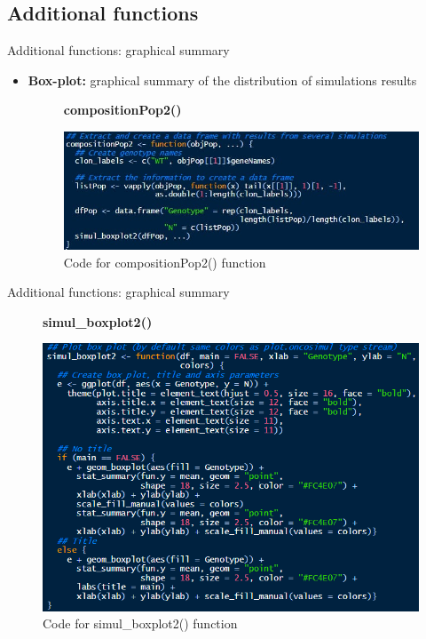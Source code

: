 \subsection{Additional functions}

\begin{frame}{Additional functions: graphical summary}
    \begin{itemize}
        \item \textbf{Box-plot:} graphical summary of the distribution of simulations results
        \textbf{}
        \begin{figure}[t]
            \centering
            \textbf{compositionPop2()}\par\medskip
            \includegraphics[scale=0.6]{img/compositionPop2.PNG}
            \caption{Code for compositionPop2() function}
        \end{figure}
    \end{itemize}
\end{frame}

\begin{frame}{Additional functions: graphical summary}
        \begin{figure}[t]
            \centering
            \textbf{simul\_boxplot2()}\par\medskip
            \includegraphics[scale=0.5]{img/simul_boxplot.PNG}
            \caption{Code for simul\_boxplot2() function}
        \end{figure}
\end{frame}

